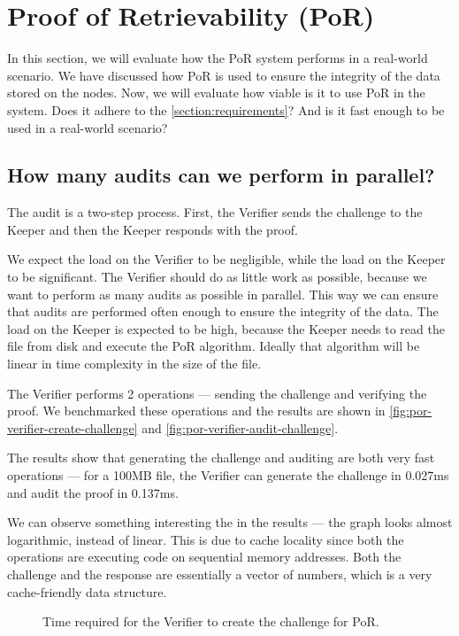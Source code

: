 \section{Proof of Retrievability (PoR)}
\label{section:por-evaluation}

In this section, we will evaluate how the PoR system performs in a real-world scenario.
We have discussed how PoR is used to ensure the integrity of the data stored on the nodes.
Now, we will evaluate how viable is it to use PoR in the system.
Does it adhere to the \autoref{section:requirements}?
And is it fast enough to be used in a real-world scenario?

\subsection{How many audits can we perform in parallel?}

The audit is a two-step process.
First, the Verifier sends the challenge to the Keeper and then the Keeper responds with the proof.

We expect the load on the Verifier to be negligible, while the load on the Keeper to be significant.
The Verifier should do as little work as possible,
because we want to perform as many audits as possible in parallel.
This way we can ensure that audits are performed often enough to ensure the integrity of the data.
The load on the Keeper is expected to be high,
because the Keeper needs to read the file from disk and execute the PoR algorithm.
Ideally that algorithm will be linear in time complexity in the size of the file.

The Verifier performs 2 operations --- sending the challenge and verifying the proof.
We benchmarked these operations and the results are shown in \autoref{fig:por-verifier-create-challenge}
and \autoref{fig:por-verifier-audit-challenge}.

The results show that generating the challenge and auditing are both very fast operations ---
for a 100MB file, the Verifier can generate the challenge in 0.027ms and
audit the proof in 0.137ms.

We can observe something interesting the in the results ---
the graph looks almost logarithmic, instead of linear.
This is due to cache locality since both the operations are executing code on sequential memory addresses.
Both the challenge and the response are essentially a vector of numbers,
which is a very cache-friendly data structure.

\begin{figure}
  \myfloatalign
  \caption{Time required for the Verifier to create the challenge for PoR.}
  \label{fig:por-verifier-create-challenge}
\end{figure}

